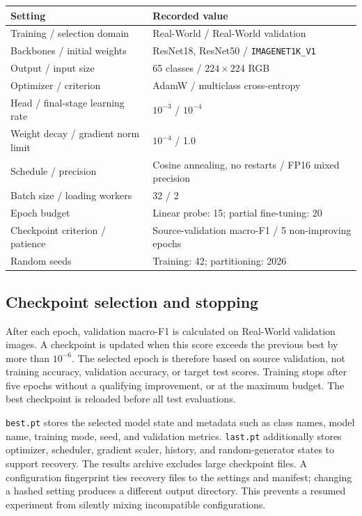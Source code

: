 \documentclass[10pt,a4paper]{article}
\begin{document}
\begin{center}\begin{minipage}{\linewidth}\centering
{}
\begin{tabularx}{\linewidth}{p{5cm}X}
\toprule
Setting & Recorded value\\
\midrule
Training / selection domain & Real-World / Real-World validation\\
Backbones / initial weights & ResNet18, ResNet50 / \texttt{IMAGENET1K\_V1}\\
Output / input size & 65 classes / $224\times224$ RGB\\
Optimizer / criterion & AdamW / multiclass cross-entropy\\
Head / final-stage learning rate & $10^{-3}$ / $10^{-4}$\\
Weight decay / gradient norm limit & $10^{-4}$ / 1.0\\
Schedule / precision & Cosine annealing, no restarts / FP16 mixed precision\\
Batch size / loading workers & 32 / 2\\
Epoch budget & Linear probe: 15; partial fine-tuning: 20\\
Checkpoint criterion / patience & Source-validation macro-F1 / 5 non-improving epochs\\
Random seeds & Training: 42; partitioning: 2026\\
\bottomrule
\end{tabularx}
\end{minipage}\end{center}

\subsection{Checkpoint selection and stopping}
After each epoch, validation macro-F1 is calculated on Real-World validation images. A checkpoint is updated when this score exceeds the previous best by more than $10^{-6}$. The selected epoch is therefore based on source validation, not training accuracy, validation accuracy, or target test scores. Training stops after five epochs without a qualifying improvement, or at the maximum budget. The best checkpoint is reloaded before all test evaluations.

\texttt{best.pt} stores the selected model state and metadata such as class names, model name, training mode, seed, and validation metrics. \texttt{last.pt} additionally stores optimizer, scheduler, gradient scaler, history, and random-generator states to support recovery. The results archive excludes large checkpoint files. A configuration fingerprint ties recovery files to the settings and manifest; changing a hashed setting produces a different output directory. This prevents a resumed experiment from silently mixing incompatible configurations.
\end{document}
